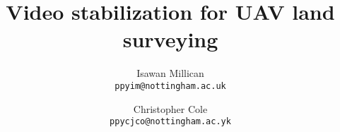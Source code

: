 \documentclass{article}
\begin{document}
\title{Video stabilization for UAV land surveying}
\author{
    Isawan Millican \\
    \texttt{ppyim@nottingham.ac.uk}\\
    \and
    Christopher Cole \\
    \texttt{ppycjco@nottingham.ac.yk}}
\maketitle






\printbibliography
\end{document}
